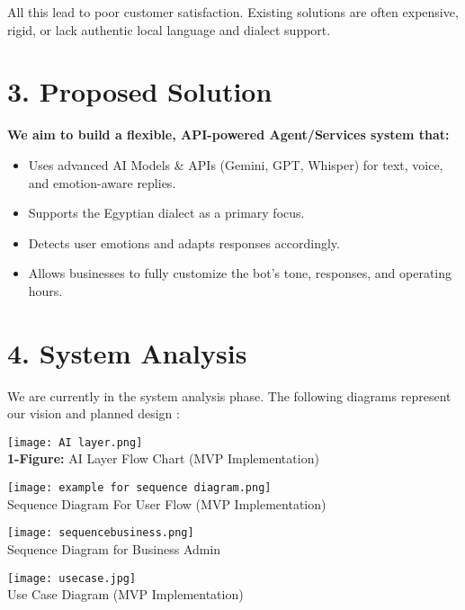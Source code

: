 \documentclass[12pt,a4paper]{article}
\begin{document}
All this lead to poor customer satisfaction. Existing solutions are often expensive, rigid, or lack authentic local
language and dialect support.

\section*{3. Proposed Solution}
\textbf{We aim to build a flexible, API-powered Agent/Services system that:}
\begin{itemize}[noitemsep]
    \item Uses advanced AI Models \& APIs (Gemini, GPT, Whisper) for text, voice, and emotion-aware
replies.
    \item Supports the Egyptian dialect as a primary focus.
    \item Detects user emotions and adapts responses accordingly.
    \item Allows businesses to fully customize the bot’s tone, responses, and operating hours.
\end{itemize}



\newpage
\section*{4. System Analysis}
We are currently in the system analysis phase. The following diagrams represent our vision and planned design :  
\begin{center}
    \texttt{[image: AI layer.png]}\\
    \textbf{1-Figure:} AI Layer Flow Chart (MVP Implementation)
\end{center}

\begin{center}
    \texttt{[image: example for sequence diagram.png]}
    \\ Sequence Diagram For User Flow (MVP Implementation)
\end{center}
\begin{center}
    \texttt{[image: sequencebusiness.png]}
    \\ Sequence Diagram for Business Admin
\end{center}
\begin{center}
     \texttt{[image: usecase.jpg]}
   \\ Use Case Diagram (MVP Implementation)
\end{center}
\end{document}
